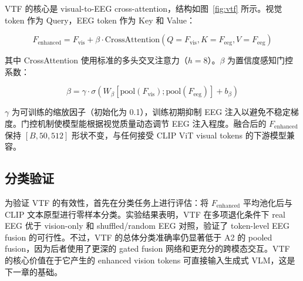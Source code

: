 VTF 的核心是 visual-to-EEG cross-attention，结构如图~\ref{fig:vtf} 所示。视觉 token 作为 Query，EEG token 作为 Key 和 Value：

\begin{equation}
  F_{\mathrm{enhanced}} = F_{\mathrm{vis}} + \beta \cdot \mathrm{CrossAttention}(Q=F_{\mathrm{vis}}, K=F_{\mathrm{eeg}}, V=F_{\mathrm{eeg}})
\end{equation}


其中 CrossAttention 使用标准的多头交叉注意力（$h=8$）。$\beta$ 为置信度感知门控系数：

\begin{equation}
  \beta = \gamma \cdot \sigma\left(W_\beta [\mathrm{pool}(F_{\mathrm{vis}}); \mathrm{pool}(F_{\mathrm{eeg}})] + b_\beta\right)
\end{equation}

$\gamma$ 为可训练的缩放因子（初始化为 0.1），训练初期抑制 EEG 注入以避免不稳定梯度。门控机制使模型能根据视觉质量动态调节 EEG 注入程度。融合后的 $F_{\mathrm{enhanced}}$ 保持 $[B, 50, 512]$ 形状不变，与任何接受 CLIP ViT visual tokens 的下游模型兼容。

\subsection{分类验证}

为验证 VTF 的有效性，首先在分类任务上进行评估：将 $F_{\mathrm{enhanced}}$ 平均池化后与 CLIP 文本原型进行零样本分类。实验结果表明，VTF 在多项退化条件下 real EEG 优于 vision-only 和 shuffled/random EEG 对照，验证了 token-level EEG fusion 的可行性。不过，VTF 的总体分类准确率仍显著低于 A2 的 pooled fusion，因为后者使用了更深的 gated fusion 网络和更充分的跨模态交互。VTF 的核心价值在于它产生的 enhanced vision tokens 可直接输入生成式 VLM，这是下一章的基础。
